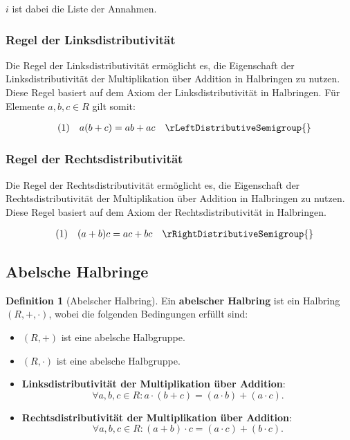 \documentclass{book}
\theoremstyle{plain}
\theoremstyle{remark}
\theoremstyle{definition}
\newtheorem{definition}{Definition}[section]
\begin{document}
\(i\) ist dabei die Liste der Annahmen.

\subsubsection*{Regel der Linksdistributivität}
\label{rule:rLeftDistributiveSemigroup}
Die Regel der Linksdistributivität ermöglicht es, die Eigenschaft der Linksdistributivität der Multiplikation über Addition in Halbringen zu nutzen. Diese Regel basiert auf dem Axiom der Linksdistributivität in Halbringen. Für Elemente \(a,b,c\in R\) gilt somit:

\[
\begin{array}{llll}
     & (1) & a(b + c) = ab+ac & \rLeftDistributiveSemigroup{}
\end{array}
\]


\subsubsection*{Regel der Rechtsdistributivität}
\label{rule:rRightDistributiveSemigroup}
Die Regel der Rechtsdistributivität ermöglicht es, die Eigenschaft der Rechtsdistributivität der Multiplikation über Addition in Halbringen zu nutzen. Diese Regel basiert auf dem Axiom der Rechtsdistributivität in Halbringen.

\[
\begin{array}{llll}
      & (1) & (a + b)c = ac+bc & \rRightDistributiveSemigroup{}
\end{array}
\]


\subsection{Abelsche Halbringe}

\begin{definition}[Abelscher Halbring]
    Ein \textbf{abelscher Halbring} ist ein Halbring \((R, +, \cdot)\), wobei die folgenden Bedingungen erfüllt sind:
    
    \begin{itemize}
        \item \((R, +)\) ist eine abelsche Halbgruppe.
        \item \((R, \cdot)\) ist eine abelsche Halbgruppe.
        \item \textbf{Linksdistributivität der Multiplikation über Addition}:
        \[
        \forall a, b, c \in R \colon a \cdot (b + c) = (a \cdot b) + (a \cdot c).
        \]
        \item \textbf{Rechtsdistributivität der Multiplikation über Addition}:
        \[
        \forall a, b, c \in R \colon (a + b) \cdot c = (a \cdot c) + (b \cdot c).
        \]
    \end{itemize}
\end{definition}
\end{document}
